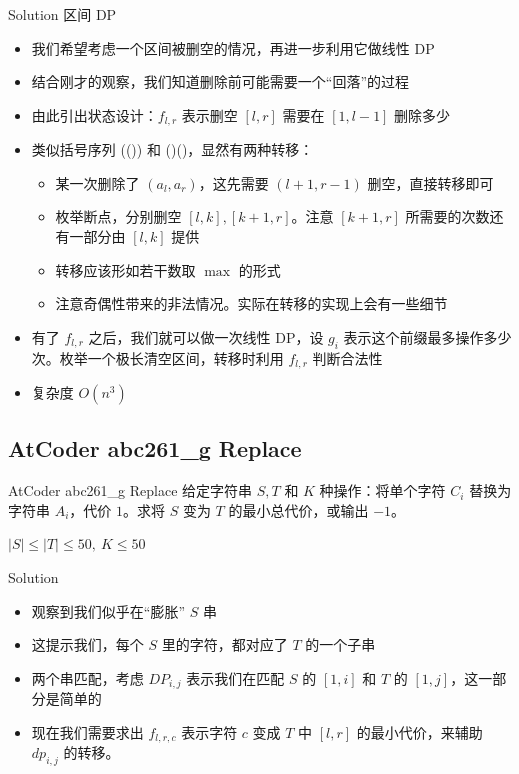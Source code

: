 ﻿\documentclass[aspectratio=169]{ctexbeamer}
\begin{document}
\begin{frame}{Solution}
    区间 DP
    \begin{itemize}
        \item 我们希望考虑一个区间被删空的情况，再进一步利用它做线性 DP
        \item 结合刚才的观察，我们知道删除前可能需要一个“回落”的过程
        \item 由此引出状态设计：$f_{l,r}$ 表示删空 $[l,r]$ 需要在 $[1,l-1]$ 删除多少
        \item 类似括号序列 (()) 和 ()()，显然有两种转移：
        \begin{itemize}
            \item 某一次删除了 $(a_l,a_r)$，这先需要 $(l+1,r-1)$ 删空，直接转移即可
            \item 枚举断点，分别删空 $[l,k],[k+1,r]$。注意 $[k+1,r]$ 所需要的次数还有一部分由 $[l,k]$ 提供
            \item 转移应该形如若干数取 $\max$ 的形式
            \item 注意奇偶性带来的非法情况。实际在转移的实现上会有一些细节
        \end{itemize}
        \item 有了 $f_{l,r}$ 之后，我们就可以做一次线性 DP，设 $g_i$ 表示这个前缀最多操作多少次。枚举一个极长清空区间，转移时利用 $f_{l,r}$ 判断合法性
        \item 复杂度 $O(n^3)$
    \end{itemize}
\end{frame}







\subsection{AtCoder abc261\_g Replace}
\begin{frame}{AtCoder abc261\_g Replace}
    给定字符串 $S,T$ 和 $K$ 种操作：将单个字符 $C_i$ 替换为字符串 $A_i$，代价 $1$。求将 $S$ 变为 $T$ 的最小总代价，或输出 $-1$。
    
    $|S|\le|T|\le 50,\ K\le 50$
\end{frame}

\begin{frame}{Solution}
    \begin{itemize}
        \item 观察到我们似乎在“膨胀” $S$ 串
        \item 这提示我们，每个 $S$ 里的字符，都对应了 $T$ 的一个子串
        \item 两个串匹配，考虑 $DP_{i,j}$ 表示我们在匹配 $S$ 的 $[1,i]$ 和 $T$ 的 $[1,j]$，这一部分是简单的
        \item 现在我们需要求出 $f_{l,r,c}$ 表示字符 $c$ 变成 $T$ 中 $[l,r]$ 的最小代价，来辅助 $dp_{i,j}$ 的转移。
    \end{itemize}
\end{frame}
\end{document}
